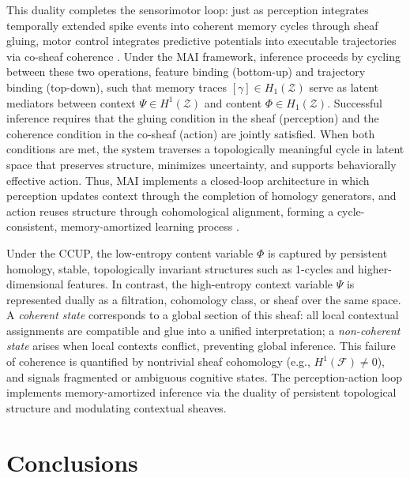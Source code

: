 \documentclass[lettersize,journal]{IEEEtran}
\begin{document}
This duality completes the sensorimotor loop: just as perception integrates temporally extended spike events into coherent memory cycles through sheaf gluing, motor control integrates predictive potentials into executable trajectories via co-sheaf coherence \cite{friston2010action}. Under the MAI framework, inference proceeds by cycling between these two operations, feature binding (bottom-up) and trajectory binding (top-down), such that memory traces \( [\gamma] \in H_1(\mathcal{Z}) \) serve as latent mediators between context \( \Psi \in H^1(\mathcal{Z}) \) and content \( \Phi \in H_1(\mathcal{Z}) \). Successful inference requires that the gluing condition in the sheaf (perception) and the coherence condition in the co-sheaf (action) are jointly satisfied. When both conditions are met, the system traverses a topologically meaningful cycle in latent space that preserves structure, minimizes uncertainty, and supports behaviorally effective action. Thus, MAI implements a closed-loop architecture in which perception updates context through the completion of homology generators, and action reuses structure through cohomological alignment, forming a cycle-consistent, memory-amortized learning process \cite{heald2021contextual}.


\begin{tcolorbox}[colback=blue!5, colframe=blue!60!black, title=Content–Context Duality under CCUP]
Under the CCUP, the low-entropy content variable \( \Phi \) is captured by persistent homology, stable, topologically invariant structures such as 1-cycles and higher-dimensional features. In contrast, the high-entropy context variable \( \Psi \) is represented dually as a filtration, cohomology class, or sheaf over the same space. A \emph{coherent state} corresponds to a global section of this sheaf: all local contextual assignments are compatible and glue into a unified interpretation; a \emph{non-coherent state} arises when local contexts conflict, preventing global inference. This failure of coherence is quantified by nontrivial sheaf cohomology (e.g., \( H^1(\mathcal{F}) \ne 0 \)), and signals fragmented or ambiguous cognitive states. The perception-action loop implements memory-amortized inference via the duality of persistent topological structure and modulating contextual sheaves.
\end{tcolorbox}

\section{Conclusions}
\label{sec:conclusion}
\end{document}
